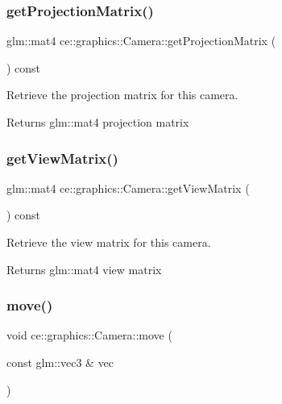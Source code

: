 \subsubsection{\texorpdfstring{get\+Projection\+Matrix()}{getProjectionMatrix()}}
{\footnotesize\ttfamily glm\+::mat4 ce\+::graphics\+::\+Camera\+::get\+Projection\+Matrix (\begin{DoxyParamCaption}{ }\end{DoxyParamCaption}) const}



Retrieve the projection matrix for this camera. 

\begin{DoxyReturn}{Returns}
glm\+::mat4 projection matrix 
\end{DoxyReturn}
\mbox{\label{classce_1_1graphics_1_1_camera_aa7934456509374221f1523a196af09fc}} 
\subsubsection{\texorpdfstring{get\+View\+Matrix()}{getViewMatrix()}}
{\footnotesize\ttfamily glm\+::mat4 ce\+::graphics\+::\+Camera\+::get\+View\+Matrix (\begin{DoxyParamCaption}{ }\end{DoxyParamCaption}) const}



Retrieve the view matrix for this camera. 

\begin{DoxyReturn}{Returns}
glm\+::mat4 view matrix 
\end{DoxyReturn}
\mbox{\label{classce_1_1graphics_1_1_camera_a93fa78fa33b430d0bb5412624678423a}} 
\subsubsection{\texorpdfstring{move()}{move()}\hspace{0.1cm}{\footnotesize\ttfamily [1/2]}}
{\footnotesize\ttfamily void ce\+::graphics\+::\+Camera\+::move (\begin{DoxyParamCaption}\item[{const glm\+::vec3 \&}]{vec }\end{DoxyParamCaption})}



